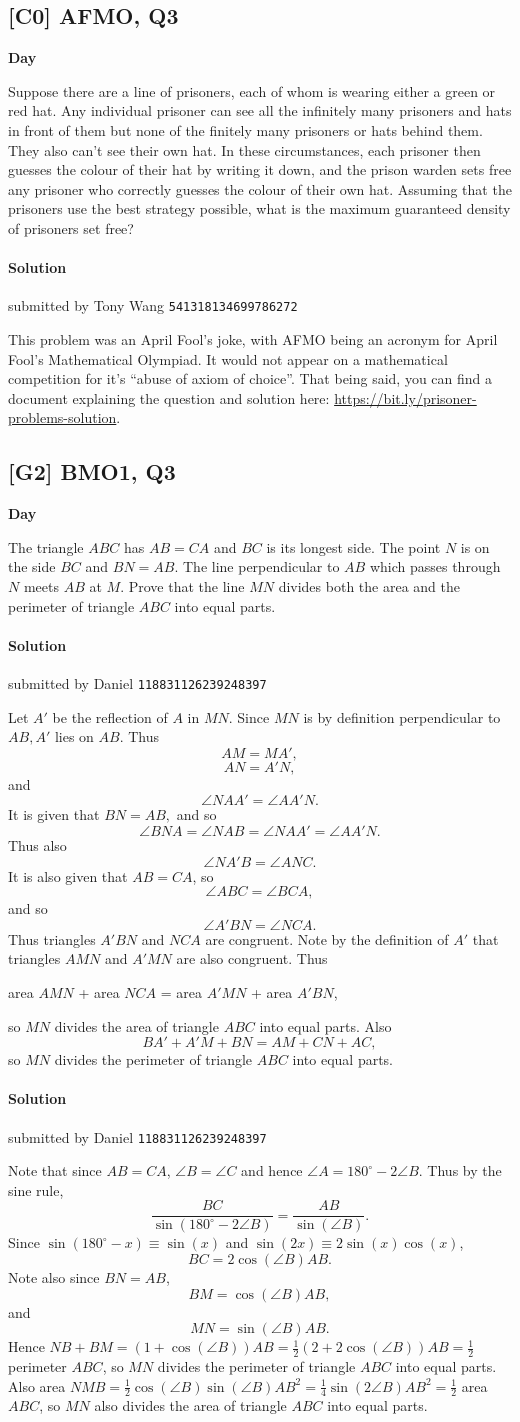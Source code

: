 \documentclass[10pt]{article}
\newcommand{\themonth}{March}
\newcommand{\theyear}{2019}
\newcounter{day}
\newcounter{solution}
\newcounter{datenumber}
\newcommand{\problem}[4][0]{
	\newpage
	\subsection{[#3] \space #2} \hfill 
	{\large\textbf{Day \arabic{day}}} %
	\begin{flushleft} #4 \end{flushleft}
	\vspace{1em}
	\addtocounter{day}{1}
	\addtocounter{datenumber}{1}
	\setcounter{solution}{1}
}
\newcommand{\solution}[4][0]{
	\paragraph{Solution \arabic{solution}} \hfill submitted by #2 \hfill \texttt{#3}
	\begin{flushleft} #4 \end{flushleft}
	\addtocounter{solution}{1}
	\vspace{1em}
}
\begin{document}
\problem[7]{2019 AFMO, Q3}{C0}{Suppose there are a line of prisoners, each of whom is wearing either a green or red hat. Any individual prisoner can see all the infinitely many prisoners and hats in front of them but none of the finitely many prisoners or hats behind them. They also can't see their own hat. In these circumstances, each prisoner then guesses the colour of their hat by writing it down, and the prison warden sets free any prisoner who correctly guesses the colour of their own hat. Assuming that the prisoners use the best strategy possible, what is the maximum guaranteed density of prisoners set free?}

\solution[7]{Tony Wang}{541318134699786272}{This problem was an April Fool's joke, with AFMO being an acronym for April Fool's Mathematical Olympiad. It would not appear on a mathematical competition for it's ``abuse of axiom of choice''. That being said, you can find a document explaining the question and solution here: \url{https://bit.ly/prisoner-problems-solution}.}

\problem[8]{2017 BMO1, Q3}{G2}{The triangle $ABC$ has $AB = CA$ and $BC$ is its longest side. The point $N$ is on the side $BC$ and $BN = AB$. The line perpendicular to $AB$ which passes through $N$ meets $AB$ at $M$. Prove that the line $MN$ divides both the area and the perimeter of triangle $ABC$ into equal parts.}

\solution[8]{Daniel}{118831126239248397}{Let $A'$ be the reflection of $A$ in $MN$. Since $MN$ is by definition perpendicular to $AB, A'$ lies on $AB$. Thus $$AM = MA',$$ $$AN = A'N,$$ and $$\angle NAA' = \angle AA'N.$$ It is given that $BN = AB,$ and so $$\angle BNA = \angle NAB = \angle NAA' = \angle AA'N.$$ Thus also $$\angle NA'B = \angle ANC.$$ It is also given that $AB = CA$, so $$\angle ABC = \angle BCA,$$ and so $$\angle A'BN = \angle NCA.$$ Thus triangles $A'BN$ and $NCA$ are congruent. Note by the definition of $A'$ that triangles $AMN$ and $A'MN$ are also congruent. Thus \begin{center}area $AMN$ + area $NCA$ = area $A'MN$ + area $A'BN$,\end{center} so $MN$ divides the area of triangle $ABC$ into equal parts. Also $$BA' + A'M + BN = AM + CN + AC,$$ so $MN$ divides the perimeter of triangle $ABC$ into equal parts.}

\solution[8]{Daniel}{118831126239248397}{Note that since $AB = CA$, $\angle B = \angle C$ and hence $\angle A = 180^{\circ} - 2\angle B$. Thus by the sine rule, $$\frac{BC}{\sin(180^{\circ} - 2\angle B)} = \frac{AB}{\sin(\angle B)}.$$ Since $\sin(180^{\circ}-x) \equiv \sin(x)$ and $\sin(2x) \equiv 2\sin(x)\cos(x)$, $$BC = 2\cos(\angle B) AB.$$ Note also since $BN = AB$, $$BM = \cos(\angle B) AB,$$ and $$MN = \sin(\angle B)AB.$$ Hence $NB + BM = (1 + \cos(\angle B)) AB = \frac{1}{2} (2 + 2\cos(\angle B))AB = \frac{1}{2}$ perimeter $ABC$, so $MN$ divides the perimeter of triangle $ABC$ into equal parts. Also area $NMB = \frac{1}{2} \cos(\angle B)\sin(\angle B) AB^2 = \frac{1}{4} \sin(2\angle B) AB^2 = \frac{1}{2}$ area $ABC$, so $MN$ also divides the area of triangle $ABC$ into equal parts.}
\end{document}
